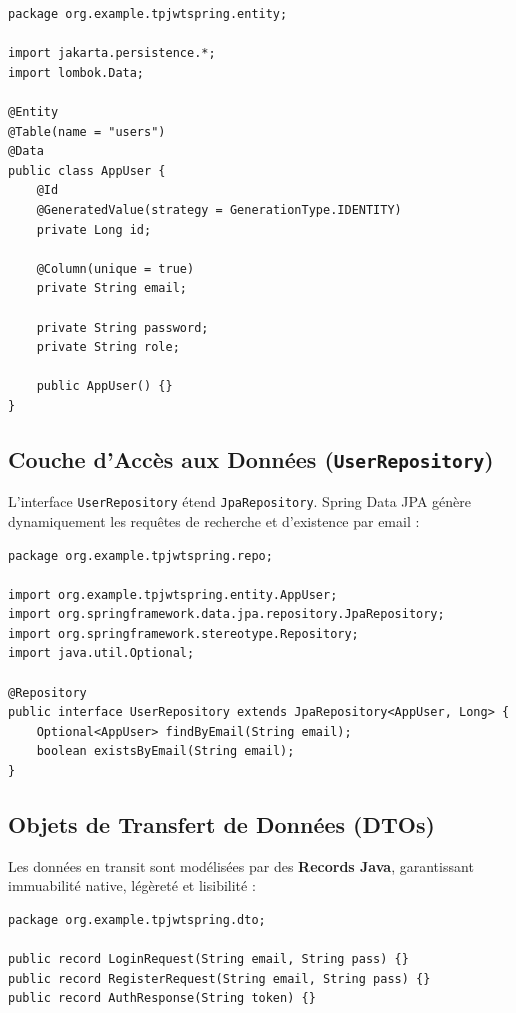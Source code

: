 \documentclass{rapportFSR}
\begin{document}
\begin{lstlisting}[style=java, caption={Entité JPA AppUser (src/.../entity/AppUser.java)}]
package org.example.tpjwtspring.entity;

import jakarta.persistence.*;
import lombok.Data;

@Entity
@Table(name = "users")
@Data
public class AppUser {
    @Id
    @GeneratedValue(strategy = GenerationType.IDENTITY)
    private Long id;

    @Column(unique = true)
    private String email;

    private String password;
    private String role;

    public AppUser() {}
}
\end{lstlisting}

\subsection{Couche d'Accès aux Données (\texttt{UserRepository})}
L'interface \texttt{UserRepository} étend \texttt{JpaRepository}. Spring Data JPA génère dynamiquement les requêtes de recherche et d'existence par email :

\begin{lstlisting}[style=java, caption={Interface UserRepository (src/.../repo/UserRepository.java)}]
package org.example.tpjwtspring.repo;

import org.example.tpjwtspring.entity.AppUser;
import org.springframework.data.jpa.repository.JpaRepository;
import org.springframework.stereotype.Repository;
import java.util.Optional;

@Repository
public interface UserRepository extends JpaRepository<AppUser, Long> {
    Optional<AppUser> findByEmail(String email);
    boolean existsByEmail(String email);
}
\end{lstlisting}

\subsection{Objets de Transfert de Données (DTOs)}
Les données en transit sont modélisées par des \textbf{Records Java}, garantissant immuabilité native, légèreté et lisibilité :

\begin{lstlisting}[style=java, caption={DTOs d'authentification en Records Java}]
package org.example.tpjwtspring.dto;

public record LoginRequest(String email, String pass) {}
public record RegisterRequest(String email, String pass) {}
public record AuthResponse(String token) {}
\end{lstlisting}
\end{document}
